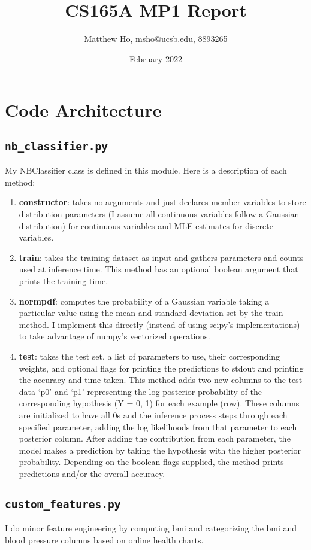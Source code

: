 \documentclass{article}
\title{CS165A MP1 Report}
\author{Matthew Ho, msho@ucsb.edu, 8893265}
\date{February 2022}
\begin{document}
\maketitle

\section{Code Architecture}
\subsection{\texttt{nb\_classifier.py}}
My NBClassifier class is defined in this module. Here is a description of each method:
\begin{enumerate}
    \item \textbf{constructor}: takes no arguments and just declares member variables to store distribution parameters (I assume all continuous variables follow a Gaussian distribution) for continuous variables and MLE estimates for discrete variables. 
    \item \textbf{train}: takes the training dataset as input and gathers parameters and counts used at inference time. This method has an optional boolean argument that prints the training time.
    \item \textbf{normpdf}: computes the probability of a Gaussian variable taking a particular value using the mean and standard deviation set by the train method. I implement this directly (instead of using scipy's implementations) to take advantage of numpy's vectorized operations.
    \item \textbf{test}: takes the test set, a list of parameters to use, their corresponding weights, and optional flags for printing the predictions to stdout and printing the accuracy and time taken. This method adds two new columns to the test data `p0' and `p1' representing the log posterior probability of the corresponding hypothesis (Y = 0, 1) for each example (row). These columns are initialized to have all 0s and the inference process steps through each specified parameter, adding the log likelihoods from that parameter to each posterior column. After adding the contribution from each parameter, the model makes a prediction by taking the hypothesis with the higher posterior probability. Depending on the boolean flags supplied, the method prints predictions and/or the overall accuracy.
\end{enumerate}
\subsection{\texttt{custom\_features.py}}
I do minor feature engineering by computing bmi and categorizing the bmi and blood pressure columns based on online health charts.
\end{document}
